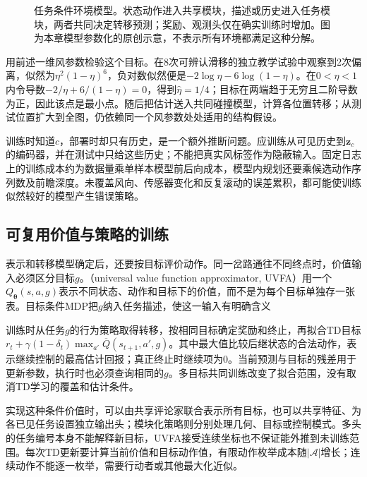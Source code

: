 \begin{figure}[htbp]
  \centering
  
  \caption{任务条件环境模型。状态动作进入共享模块，描述或历史进入任务模块，两者共同决定转移预测；奖励、观测头仅在确实训练时增加。图为本章模型参数化的原创示意，不表示所有环境都满足这种分解。}
  \label{fig:rl-transfer-model}
\end{figure}

用前述一维风参数检验这个目标。在8次可辨认滑移的独立教学试验中观察到2次偏离，似然为$\eta^2(1-\eta)^6$，负对数似然便是$-2\log\eta-6\log(1-\eta)$。在$0<\eta<1$内令导数$-2/\eta+6/(1-\eta)=0$，得到$\widehat\eta=1/4$；目标在两端趋于无穷且二阶导数为正，因此该点是最小点。随后把估计送入共同碰撞模型，计算各位置转移；从测试位置扩大到全图，仍依赖同一个风参数处处适用的结构假设。

训练时知道$c$，部署时却只有历史，是一个额外推断问题。应训练从可见历史到$\bm z_c$的编码器，并在测试中只给这些历史；不能把真实风标签作为隐蔽输入。固定日志上的训练成本约为数据量乘单样本模型前后向成本，模型内规划还要乘候选动作序列数及前瞻深度。未覆盖风向、传感器变化和反复滚动的误差累积，都可能使训练似然较好的模型产生错误策略。

\subsection{可复用价值与策略的训练}
\label{sec:rl-transfer-value-training}

表示和转移模型确定后，还要按目标评价动作。同一岔路通往不同终点时，价值输入必须区分目标$g$。（universal value function approximator, UVFA）用一个$Q_{\bm\theta}(s,a,g)$表示不同状态、动作和目标下的价值，而不是为每个目标单独存一张表。目标条件MDP把$g$纳入任务描述，使这一输入有明确含义

训练时从任务$g$的行为策略取得转移，按相同目标确定奖励和终止，再拟合TD目标$r_t+\gamma(1-\delta_t)\max_{a'}\overline Q(s_{t+1},a',g)$。其中最大值比较后继状态的合法动作，表示继续控制的最高估计回报；真正终止时继续项为0。当前预测与目标的残差用于更新参数，执行时也必须查询相同的$g$。多目标共同训练改变了拟合范围，没有取消TD学习的覆盖和估计条件。

实现这种条件价值时，可以由共享评论家联合表示所有目标，也可以共享特征、为各已见任务设置独立输出头；模块化策略则分别处理几何、目标或控制模式。多头的任务编号本身不能解释新目标，UVFA接受连续坐标也不保证能外推到未训练范围。每次TD更新要计算当前价值和目标动作值，有限动作枚举成本随$|\mathcal A|$增长；连续动作不能逐一枚举，需要行动者或其他最大化近似。


